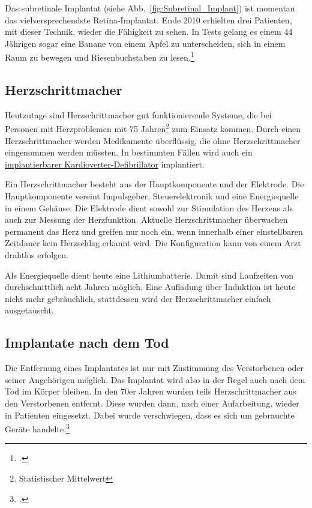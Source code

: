 Das subretinale Implantat (siehe Abb.~\vref{fig:Subretinal_Implant}) ist momentan das
vielversprechendste Retina-Implantat. Ende 2010 erhielten
drei Patienten, mit dieser Technik, wieder die Fähigkeit zu sehen. In Tests gelang es einem 44
Jährigen sogar eine Banane von einem Apfel zu unterscheiden, sich in einem Raum zu bewegen und
Riesenbuchstaben zu lesen.\footcite{Independent:retina_chip}

\subsection{Herzschrittmacher}
\label{sec:Robin:topical:Pacemaker}
Heutzutage sind Herzschrittmacher gut funktionierende Systeme, die bei Personen mit Herzproblemen mit
75 Jahren\footnote{Statistischer Mittelwert} zum Einsatz kommen. Durch einen Herzschrittmacher werden
Medikamente überflüssig, die ohne Herzschrittmacher eingenommen werden müssten.
In bestimmten Fällen wird auch ein
\href{http://de.wikipedia.org/wiki/Implantierbarer_Kardioverter-Defibrillator}%
{implantierbarer Kardioverter-Defibrillator} implantiert.

Ein Herzschrittmacher besteht aus der Hauptkomponente und der Elektrode. Die Hauptkomponente vereint
Impulsgeber, Steuerelektronik und eine Energiequelle in einem Gehäuse. Die Elektrode dient sowohl zur
Stimulation des Herzens als auch zur Messung der Herzfunktion. Aktuelle Herzschrittmacher überwachen
permanent das Herz und greifen nur noch ein, wenn innerhalb einer einstellbaren Zeitdauer kein
Herzschlag erkannt wird. Die Konfiguration kann von einem Arzt drahtlos erfolgen.

Als Energiequelle dient heute eine Lithiumbatterie. Damit sind Laufzeiten von durchschnittlich acht
Jahren möglich. Eine Aufladung über Induktion ist heute nicht mehr gebräuchlich, stattdessen wird der
Herzschrittmacher einfach ausgetauscht.

\subsection{Implantate nach dem Tod}
Die Entfernung eines Implantates ist nur mit Zustimmung des Verstorbenen oder seiner Angehörigen
möglich. Das Implantat wird also in der Regel auch nach dem Tod im Körper bleiben. In den 70er Jahren
wurden teils Herzschrittmacher aus den Verstorbenen entfernt. Diese wurden dann, nach einer
Aufarbeitung, wieder in Patienten eingesetzt. Dabei wurde verschwiegen, dass es sich um gebrauchte
Geräte handelte.\footcite{Spiegel:Herzschrittmacher-Prozess}
